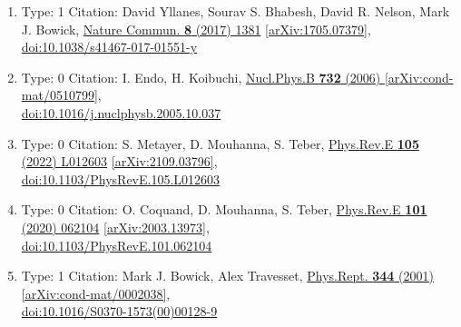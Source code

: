\documentclass[a4paper,10pt]{article}
\begin{document}
\begin{enumerate}
\begin{enumerate}
  \item Type: 1 Citation: David Yllanes, Sourav S. Bhabesh, David R. Nelson, Mark J. Bowick, \href{https://www.doi.org/10.1038/s41467-017-01551-y}{Nature Commun. {\bf 8} (2017) 1381}  \href{https://arxiv.org/abs/1705.07379}{[arXiv:1705.07379]},\\\href{https://www.doi.org/10.1038/s41467-017-01551-y}{doi:10.1038/s41467-017-01551-y}
  \item Type: 0 Citation: I. Endo, H. Koibuchi, \href{https://www.doi.org/10.1016/j.nuclphysb.2005.10.037}{Nucl.Phys.B {\bf 732} (2006) }  \href{https://arxiv.org/abs/cond-mat/0510799}{[arXiv:cond-mat/0510799]},\\\href{https://www.doi.org/10.1016/j.nuclphysb.2005.10.037}{doi:10.1016/j.nuclphysb.2005.10.037}
  \item Type: 0 Citation: S. Metayer, D. Mouhanna, S. Teber, \href{https://www.doi.org/10.1103/PhysRevE.105.L012603}{Phys.Rev.E {\bf 105} (2022) L012603}  \href{https://arxiv.org/abs/2109.03796}{[arXiv:2109.03796]},\\\href{https://www.doi.org/10.1103/PhysRevE.105.L012603}{doi:10.1103/PhysRevE.105.L012603}
  \item Type: 0 Citation: O. Coquand, D. Mouhanna, S. Teber, \href{https://www.doi.org/10.1103/PhysRevE.101.062104}{Phys.Rev.E {\bf 101} (2020) 062104}  \href{https://arxiv.org/abs/2003.13973}{[arXiv:2003.13973]},\\\href{https://www.doi.org/10.1103/PhysRevE.101.062104}{doi:10.1103/PhysRevE.101.062104}
  \item Type: 1 Citation: Mark J. Bowick, Alex Travesset, \href{https://www.doi.org/10.1016/S0370-1573(00)00128-9}{Phys.Rept. {\bf 344} (2001) }  \href{https://arxiv.org/abs/cond-mat/0002038}{[arXiv:cond-mat/0002038]},\\\href{https://www.doi.org/10.1016/S0370-1573(00)00128-9}{doi:10.1016/S0370-1573(00)00128-9}

\end{enumerate}
\end{enumerate}
\end{document}
